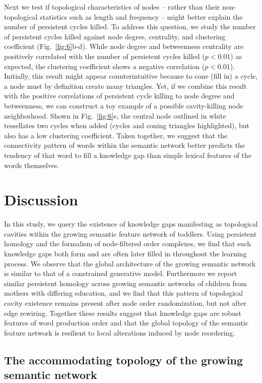 \documentclass{article}
\begin{document}
Next we test if topological characteristics of nodes -- rather than their non-topological statistics such as length and frequency -- might better explain the number of persistent cycles killed. To address this question, we study the number of persistent cycles killed against node degree, centrality, and clustering coefficient (Fig.~\ref{fig:6}b-d). While node degree and betweenness centrality are positively correlated with the number of persistent cycles killed ($p<0.01$) as expected, the clustering coefficient shows a negative correlation ($p<0.01$). Initially, this result might appear counterintuitive because to cone (fill in) a cycle, a node must by definition create many triangles. Yet, if we combine this result with the positive correlations of persistent cycle killing to node degree and betweenness, we can construct a toy example of a possible cavity-killing node neighborhood. Shown in Fig.~\ref{fig:6}e, the central node outlined in white tessellates two cycles when added (cycles and coning triangles highlighted), but also has a low clustering coefficient. Taken together, we suggest that the connectivity pattern of words within the semantic network better predicts the tendency of that word to fill a knowledge gap than simple lexical features of the words themselves.



\section*{Discussion}

In this study, we query the existence of knowledge gaps manifesting as topological cavities within the growing semantic feature network of toddlers. Using persistent homology and the formalism of node-filtered order complexes, we find that such knowledge gaps both form and are often later filled in throughout the learning process. We observe that the global architecture of the growing semantic network is similar to that of a constrained generative model. Furthermore we report similar persistent homology across growing semantic networks of children from mothers with differing education, and we find that this pattern of topological cavity existence remains present after node order randomization, but not after edge rewiring. Together these results suggest that knowledge gaps are robust features of word production order and that the global topology of the semantic feature network is resilient to local alterations induced by node reordering.


\subsection*{The accommodating topology of the growing semantic network}
\end{document}
